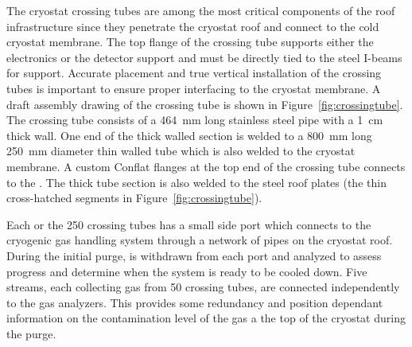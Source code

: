 The cryostat crossing tubes are among the most critical components of the roof infrastructure since they penetrate the cryostat roof and connect to the cold cryostat membrane. The top flange of the crossing tube supports either the electronics \fdth or the detector support \fdth and must be directly tied to the steel I-beams for support. 
Accurate placement and true vertical installation of the crossing tubes is important to ensure proper interfacing to the cryostat membrane. 
A draft assembly drawing of the crossing tube is shown in Figure~\ref{fig:crossingtube}. 
The crossing tube consists of a \SI{464}{mm} long stainless steel pipe with a \SI{1}{cm} thick wall. 
One end of the thick walled section is welded to a \SI{800}{mm} long \SI{250}{mm} diameter thin walled tube which is also welded to the cryostat membrane.
A custom Conflat flanges at the top end of the crossing tube connects to the \fdth. 
The thick tube section is also welded to the steel roof plates (the thin cross-hatched segments in Figure~\ref{fig:crossingtube}).  


 
Each or the 250 crossing tubes has a small side port which connects to the cryogenic gas handling system through a network of pipes on the cryostat roof. During the initial  purge,   is withdrawn from each port and analyzed to assess progress and determine when the system is ready to be cooled down. Five  streams, each collecting gas from 50 crossing tubes, are connected independently to the gas analyzers. This provides some redundancy and position dependant information on the contamination level of the gas a the top of the cryostat during the purge.
 
